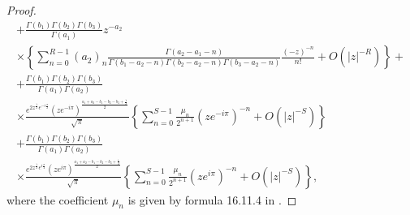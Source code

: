 \documentclass[smallextended]{svjour3}
\begin{document}
\begin{proof}
\begin{eqnarray}
+\frac{\Gamma(b_1)\Gamma(b_2)\Gamma(b_3)}{\Gamma(a_1)}z^{-a_2}\nonumber\\\times\left\{\sum\limits_{n=0}^{R-1}(a_2)_n\frac{\Gamma(a_2-a_1-n) }{\Gamma(b_1-a_2-n)\Gamma(b_2-a_2-n)\Gamma(b_3-a_2-n)}\frac{(-z)^{-n}}{n!}+O(|z|^{-R})\right\}+\nonumber\\
+\frac{\Gamma(b_1)\Gamma(b_2)\Gamma(b_3)}{\Gamma(a_1)\Gamma(a_2)}\nonumber\\\times\frac{e^{2z^{\frac{1}{2}}e^{-i\frac{\pi}{2}}}(ze^{-i\pi})^{\frac{a_1+a_2-b_1-b_2-b_3+\frac{1}{2}}{2}}}{\sqrt{\pi}}\left\{\sum\limits_{n=0}^{S-1}\frac{\mu_n}{2^{n+1}}(ze^{-i\pi})^{-n}+O(|z|^{-S})\right\}
\nonumber\\+\frac{\Gamma(b_1)\Gamma(b_2)\Gamma(b_3)}{\Gamma(a_1)\Gamma(a_2)}\nonumber\\\times \frac{e^{2z^{\frac{1}{2}}e^{i\frac{\pi}{2}}}(ze^{i\pi})^{\frac{a_1+a_2-b_1-b_2-b_3+\frac{1}{2}}{2}}}{\sqrt{\pi}}\left\{\sum\limits_{n=0}^{S-1}\frac{\mu_n}{2^{n+1}}(ze^{i\pi})^{-n}+O(|z|^{-S})\right\},
\label{asy2-3}
\end{eqnarray}
where the coefficient $\mu_n$ is given by formula 16.11.4 in \cite{ND}.


\end{proof}
\end{document}
